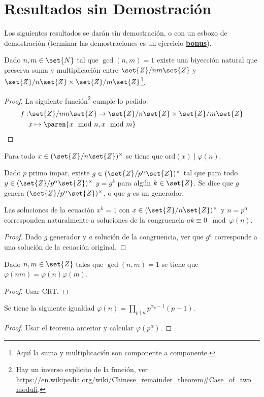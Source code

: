 \documentclass{ayudantia}
\begin{document}
\section{Resultados sin Demostración}
Los siguientes resultados se darán sin demostración, o con un esbozo de demostración (terminar las demostraciones es un ejercicio \underline{\textbf{bonus}}).
\begin{thm}
    Dado \(n,m\in\set{N}\) tal que \(\gcd(n,m)=1\) existe una biyección natural que preserva suma y multiplicación entre \(\set{Z}/nm\set{Z}\) y \(\set{Z}/n\set{Z}\times\set{Z}/m\set{Z}\)\footnote{Aquí la suma y multiplicación son componente a componente.}.
\end{thm}
\begin{proof}
    La siguiente función\footnote{Hay un inverso explicito de la función, ver \url{https://en.wikipedia.org/wiki/Chinese_remainder_theorem\#Case_of_two_moduli}.} cumple lo pedido:
    \begin{align*}
        f:&\set{Z}/nm\set{Z}\rightarrow \set{Z}/n\set{Z}\times\set{Z}/m\set{Z}\\
        &x\mapsto\paren{x\mod n,x\mod m}
    \end{align*}
\end{proof}
\begin{thm}
    Para todo \(x\in(\set{Z}/n\set{Z})^\times\) se tiene que \(\text{ord}(x)\mid\varphi(n)\).
\end{thm}
\begin{thm}
    Dado \(p\) primo impar, existe \(g\in(\set{Z}/p^\alpha\set{Z})^\times\) tal que para todo \(y\in(\set{Z}/p^\alpha\set{Z})^\times\) \(y=g^k\) para algún \(k\in\set{Z}\). Se dice que \(g\) genera \((\set{Z}/p^\alpha\set{Z})^\times\), o que \(g\) es un generador.
\end{thm}
\begin{cor}
    Las soluciones de la ecuación \(x^k=1\) con \(x\in(\set{Z}/n\set{Z})^\times\) y \(n=p^\alpha\) corresponden naturalmente a soluciones de la congruencia \(ak\equiv 0\mod\varphi(n)\).
\end{cor}
\begin{proof}
    Dado \(g\) generador y \(a\) solución de la congruencia, ver que \(g^a\) corresponde a una solución de la ecuación original.
\end{proof}
\begin{thm}
    Dado \(n,m\in\set{Z}\) tales que \(\gcd(n,m)=1\) se tiene que \(\varphi(nm)=\varphi(n)\varphi(m)\).
\end{thm}
\begin{proof}
    Usar CRT.
\end{proof}
\begin{cor}
    Se tiene la siguiente igualdad \(\varphi(n)=\prod_{p\mid n}p^{\alpha_p-1}(p-1)\).
\end{cor}
\begin{proof}
    Usar el teorema anterior y calcular \(\varphi(p^\alpha)\).
\end{proof}
\end{document}
